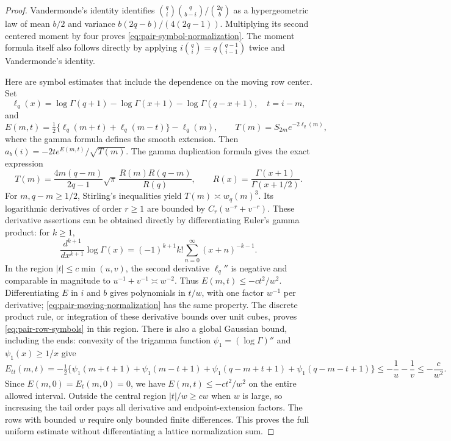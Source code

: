 \begin{proof}
Vandermonde's identity identifies
$\binom qi\binom q{b-i}/\binom{2q}{b}$ as a hypergeometric law of
mean $b/2$ and variance $b(2q-b)/(4(2q-1))$.
Multiplying its second centered moment by four proves
\eqref{eq:pair-symbol-normalization}.  The moment formula itself
also follows directly by applying
$i\binom qi=q\binom{q-1}{i-1}$ twice and Vandermonde's identity.

Here are symbol estimates that include the dependence on the moving
row center.  Set
\[
 \ell_q(x)=\log\Gamma(q+1)-\log\Gamma(x+1)
                         -\log\Gamma(q-x+1),\quad t=i-m,
\]
and
\[
 E(m,t)=\tfrac12\{\ell_q(m+t)+\ell_q(m-t)\}-\ell_q(m),
 \qquad T(m)=S_{2m}e^{-2\ell_q(m)},
\]
where the gamma formula defines the smooth extension.  Then
$a_b(i)=-2t e^{E(m,t)}/\sqrt{T(m)}$.  The gamma duplication formula
gives the exact expression
\begin{equation}
 T(m)=\frac{4m(q-m)}{2q-1}\sqrt\pi\,
       \frac{R(m)R(q-m)}{R(q)},
 \qquad R(x)=\frac{\Gamma(x+1)}{\Gamma(x+1/2)}.
 \label{eq:pair-moving-normalization}
\end{equation}
For $m,q-m\geq1/2$, Stirling's inequalities yield
$T(m)\asymp w_q(m)^3$.  Its logarithmic derivatives of order $r\geq1$
are bounded by $C_r(u^{-r}+v^{-r})$.  These derivative assertions
can be obtained directly by differentiating Euler's gamma product:
for $k\geq1$,
\[
 \frac{d^{k+1}}{dx^{k+1}}\log\Gamma(x)
       =(-1)^{k+1}k!\sum_{n=0}^{\infty}(x+n)^{-k-1}.
\]
In the region $|t|\leq c\min(u,v)$, the second derivative
$\ell_q''$ is negative and comparable in magnitude to
$u^{-1}+v^{-1}\asymp w^{-2}$.  Thus
$E(m,t)\leq-ct^2/w^2$.  Differentiating $E$ in $i$ and $b$ gives
polynomials in $t/w$, with one factor $w^{-1}$ per derivative;
\eqref{eq:pair-moving-normalization} has the same property.
The discrete product rule, or integration of these derivative bounds
over unit cubes, proves \eqref{eq:pair-row-symbols} in this region.
There is also a global Gaussian bound, including the ends: convexity
of the trigamma function $\psi_1=(\log\Gamma)''$ and
$\psi_1(x)\geq1/x$ give
\[
 E_{tt}(m,t)=-\tfrac12\bigl\{
 \psi_1(m+t+1)+\psi_1(m-t+1)
 +\psi_1(q-m+t+1)+\psi_1(q-m-t+1)\bigr\}
 \leq-\frac1u-\frac1v\leq-\frac c{w^2}.
\]
Since $E(m,0)=E_t(m,0)=0$, we have $E(m,t)\leq-ct^2/w^2$
on the entire allowed interval.  Outside the central region
$|t|/w\geq cw$ when $w$ is large, so increasing the tail order pays
all derivative and endpoint-extension factors.  The rows with bounded
$w$ require only bounded finite differences.  This proves the full
uniform estimate without differentiating a lattice normalization sum.


\end{proof}

